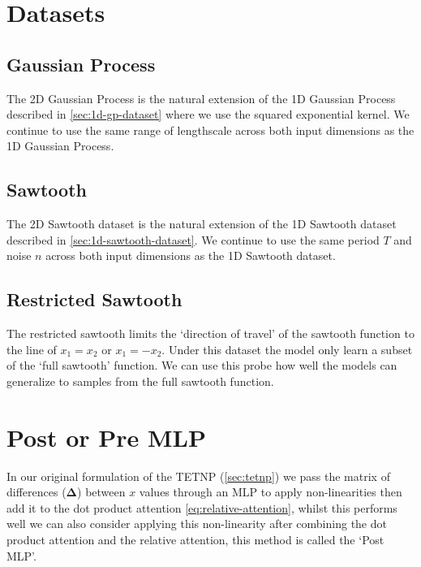 \documentclass[../../main.tex]{subfiles}
\begin{document}
\section{Datasets}

\subsection{Gaussian Process}

The 2D Gaussian Process is the natural extension of the 1D Gaussian Process described in \autoref{sec:1d-gp-dataset} where we use the squared exponential kernel. We continue to use the same range of lengthscale across both input dimensions as the 1D Gaussian Process. 




\subsection{Sawtooth}

The 2D Sawtooth dataset is the natural extension of the 1D Sawtooth dataset described in \autoref{sec:1d-sawtooth-dataset}. We continue to use the same period $T$ and noise $n$ across both input dimensions as the 1D Sawtooth dataset.



\subsection{Restricted Sawtooth}

The restricted sawtooth limits the `direction of travel' of the sawtooth function to the line of $x_1 = x_2$ or $x_1 = -x_2$. Under this dataset the model only learn a subset of the `full sawtooth' function. We can use this probe how well the models can generalize to samples from the full sawtooth function.


\section{Post or Pre MLP}

In our original formulation of the TETNP (\autoref{sec:tetnp}) we pass the matrix of differences ($\bm{\Delta}$) between $x$ values through an MLP to apply non-linearities then add it to the dot product attention \autoref{eq:relative-attention}, whilst this performs well we can also consider applying this non-linearity after combining the dot product attention and the relative attention, this method is called the `Post MLP'. 
\end{document}
